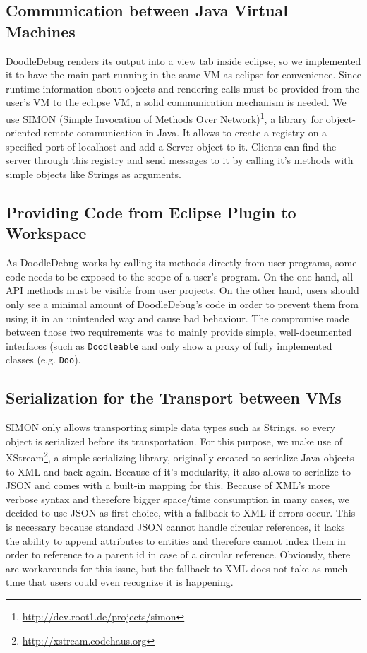 \documentclass[english]{acm_proc_article-sp}
\newcommand\meta[1]{\nbc{META}{#1}{purple}}
\begin{document}
\subsection{Communication between Java Virtual Machines}
DoodleDebug renders its output into a view tab inside eclipse, so we implemented it to have the main part running in the same VM as eclipse for convenience. Since runtime information about objects and rendering calls must be provided from the user's VM to the eclipse VM, a solid communication mechanism is needed. We use SIMON (Simple Invocation of Methods Over Network)\footnote{\url{http://dev.root1.de/projects/simon}}, a library for object-oriented remote communication in Java. It allows to create a registry on a specified port of localhost and add a Server object to it. Clients can find the server through this registry and send messages to it by calling it's methods with simple objects like Strings as arguments.

\subsection{Providing Code from Eclipse Plugin to Workspace}
\meta{Appendix?}
As DoodleDebug works by calling its methods directly from user programs, some code needs to be exposed to the scope of a user's program. On the one hand, all API methods must be visible from user projects. On the other hand, users should only see a minimal amount of DoodleDebug's code in order to prevent them from using it in an unintended way and cause bad behaviour. The compromise made between those two requirements was to mainly provide simple, well-documented interfaces (such as \verb-Doodleable- and only show a proxy of fully implemented classes (e.g. \verb-Doo-).

\subsection{Serialization for the Transport between VMs}
SIMON only allows transporting simple data types such as Strings, so every object is serialized before its transportation. For this purpose, we make use of XStream\footnote{\url{http://xstream.codehaus.org}}, a simple serializing library, originally created to serialize Java objects to XML and back again. Because of it's modularity, it also allows to serialize to JSON and comes with a built-in mapping for this. Because of XML's more verbose syntax and therefore bigger space/time consumption in many cases, we decided to use JSON as first choice, with a fallback to XML if errors occur. This is necessary because standard JSON cannot handle circular references, it lacks the ability to append attributes to entities and therefore cannot index them in order to reference to a parent id in case of a circular reference. Obviously, there are workarounds for this issue, but the fallback to XML does not take as much time that users could even recognize it is happening.
\end{document}
